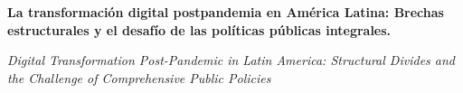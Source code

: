 \documentclass{article}
\renewcommand{\normalsize}{\fontsize{10pt}{13pt}\selectfont}
\newcommand{\articulotipo}{}
\newcommand{\articulotitulo}{}
\newcommand{\articulotitulotrans}{}
\newcommand{\articuloautores}{}
\newcommand{\articulodoi}{}
\newcommand{\articuloidiomaxml}{es}
\newcommand{\articulorevista}{}
\newcommand{\articuloissne}{}
\newcommand{\articulovolumen}{}
\newcommand{\articulonumero}{}
\newcommand{\articulofecha}{}
\newcommand{\articulopagina}{0}
\begin{document}

\renewcommand{\articuloidiomaxml}{es}
\renewcommand{\articulotitulo}{La transformación digital postpandemia en América Latina: Brechas estructurales y el desafío de las políticas públicas integrales.}
\renewcommand{\articuloautores}{Sol Freitas}
\renewcommand{\articulodoi}{10.5334/dsj-2026-012}
\renewcommand{\articulotipo}{EDITORIAL}
\renewcommand{\articulorevista}{Revista Soma}
\renewcommand{\articuloissne}{2177-1634}
\renewcommand{\articulovolumen}{01}
\renewcommand{\articulonumero}{01}
\renewcommand{\articulofecha}{ 2026}
\renewcommand{\articulopagina}{1}

\setcounter{page}{1}
\thispagestyle{firstpage}

\noindent\begin{minipage}[t]{\dimexpr\textwidth+\marginparsep+\marginparwidth\relax}%
{\sffamily\bfseries\Large\articulotitulo\par}%
\end{minipage}\par
\vspace{3mm}%
\renewcommand{\articulotitulotrans}{Digital Transformation Post-Pandemic in Latin America: Structural Divides and the Challenge of Comprehensive Public Policies}
\noindent\begin{minipage}[t]{\dimexpr\textwidth+\marginparsep+\marginparwidth\relax}%
{\sffamily\itshape\normalsize\articulotitulotrans\par}%
\end{minipage}\par
\vspace{4mm}%
\end{document}
